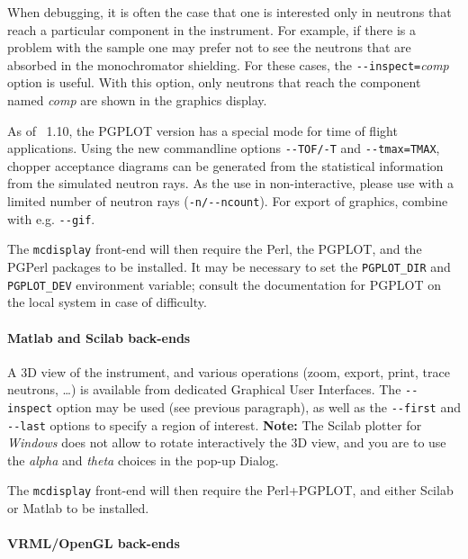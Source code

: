 When debugging, it is often the case that one is interested only in
neutrons that reach a particular component in the instrument. For
example, if there is a problem with the sample one may prefer not to see
the neutrons that are absorbed in the monochromator shielding. For these
cases, the \verb+--inspect=+\textit{comp\/} option is useful. With this
option, only neutrons that reach the component named \textit{comp\/} are
shown in the graphics display.

As of \MCS\ 1.10, the PGPLOT version has a special mode for time of
flight applications. Using the new commandline options \verb+--TOF/-T+
and \verb+--tmax=TMAX+, chopper acceptance diagrams can be generated
from the statistical information from the simulated neutron rays. As
the use in non-interactive, please use with a limited number of
neutron rays (\verb+-n/--ncount+). For export of graphics, combine
with e.g. \verb+--gif+.

The \verb+mcdisplay+ front-end will then require the Perl, the PGPLOT, and the
PGPerl packages to be installed. It may be necessary to set the
\verb+PGPLOT_DIR+ and \verb+PGPLOT_DEV+ environment variable; consult the
documentation for PGPLOT on the local system in case of difficulty.
  

\paragraph{Matlab and Scilab back-ends}

A 3D view of the instrument, and various operations (zoom, export, print, trace neutrons, \ldots) is available from dedicated Graphical User Interfaces.
The \verb+--inspect+ option may be used (see previous paragraph), as well as the \verb+--first+ and \verb+--last+ options to specify a region of interest. {\bf Note:} The Scilab plotter for \emph{Windows} does not allow to rotate interactively the 3D view, and you are to use the \emph{alpha} and \emph{theta} choices in the pop-up Dialog.

The \verb+mcdisplay+ front-end will then
require the Perl+PGPLOT, and either Scilab or Matlab to be installed.  

\paragraph{VRML/OpenGL back-ends}

